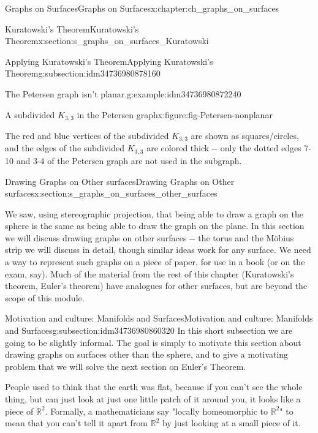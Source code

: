 \documentclass[oneside,10pt,]{book}
\numberwithin{equation}{section}
\newcommand{\reals}{\mathbb{R}}
\begin{document}
\begin{chapterptx}{Graphs on Surfaces}{}{Graphs on Surfaces}{}{}{x:chapter:ch_graphs_on_surfaces}
\begin{sectionptx}{Kuratowski's Theorem}{}{Kuratowski's Theorem}{}{}{x:section:s_graphs_on_surfaces_Kuratowski}
\begin{subsectionptx}{Applying Kuratowski's Theorem}{}{Applying Kuratowski's Theorem}{}{}{g:subsection:idm34736980878160}
\begin{example}{The Petersen graph isn't planar.}{g:example:idm34736980872240}
\begin{figureptx}{A subdivided \(K_{3,3}\) in the Petersen graph}{x:figure:fig-Petersen-nonplanar}{}
\begin{image}{0.05}{0.9}{0.05}
{\begin{tikzpicture}
\end{tikzpicture}
}%
\end{image}%
\tcblower
\end{figureptx}%
The red and blue vertices of the subdivided \(K_{3,3}\) are shown as squares\slash{}circles, and the edges of the subdivided \(K_{3,3}\) are colored thick -{}-{} only the dotted edges 7-10 and 3-4 of the Petersen graph are not used in the subgraph.%
\end{example}
\end{subsectionptx}
\end{sectionptx}
%
%
\typeout{************************************************}
\typeout{************************************************}
%
\begin{sectionptx}{Drawing Graphs on Other surfaces}{}{Drawing Graphs on Other surfaces}{}{}{x:section:s_graphs_on_surfaces_other_surfaces}
\begin{introduction}{}%
We saw, using stereographic projection, that being able to draw a graph on the sphere is the same as being able to draw the graph on the plane.  In this section we will discuss drawing graphs on other surfaces -{}-{} the torus and the Möbius strip we will discuss in detail, though similar ideas work for any surface.  We need a way to represent such graphs on a piece of paper, for use in a book (or on the exam, say).  Much of the material from the rest of this chapter (Kuratowski's theorem, Euler's theorem) have analogues for other surfaces, but are beyond the scope of this module.%
\end{introduction}%
%
%
\typeout{************************************************}
\typeout{************************************************}
%
\begin{subsectionptx}{Motivation and culture: Manifolds and Surfaces}{}{Motivation and culture: Manifolds and Surfaces}{}{}{g:subsection:idm34736980860320}
In this short subsection we are going to be slightly informal.  The goal is simply to motivate this section about drawing graphs on surfaces other than the sphere, and to give a motivating problem that we will solve the next section on Euler's Theorem.%
\par
People used to think that the earth was flat, because if you can't see the whole thing, but can just look at just one little patch of it around you, it looks like a piece of \(\reals^2\).  Formally, a mathematicians say "locally homeomorphic to \(\reals^2\)" to mean that you can't tell it apart from \(\reals^2\) by just looking at a small piece of it.%

\end{subsectionptx}
\end{sectionptx}
\end{chapterptx}
\end{document}
